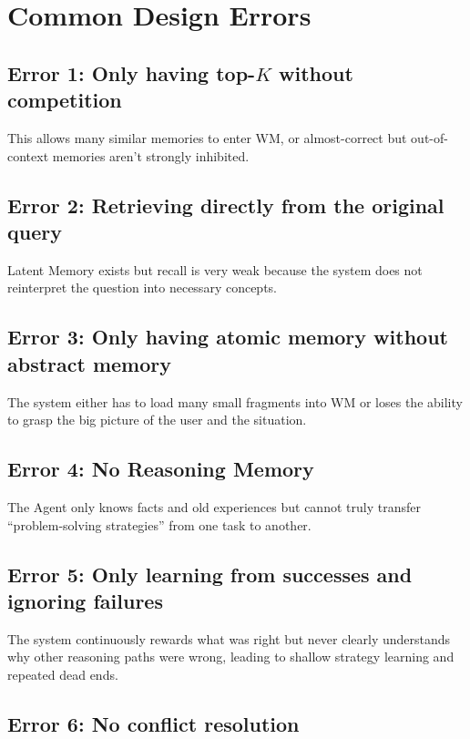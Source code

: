 \documentclass[a4paper,12pt]{article}
\begin{document}
\section{Common Design Errors}

\subsection*{Error 1: Only having top-$K$ without competition}

This allows many similar memories to enter WM, or almost-correct but out-of-context memories aren't strongly inhibited.

\subsection*{Error 2: Retrieving directly from the original query}

Latent Memory exists but recall is very weak because the system does not reinterpret the question into necessary concepts.

\subsection*{Error 3: Only having atomic memory without abstract memory}

The system either has to load many small fragments into WM or loses the ability to grasp the big picture of the user and the situation.

\subsection*{Error 4: No Reasoning Memory}

The Agent only knows facts and old experiences but cannot truly transfer ``problem-solving strategies'' from one task to another.

\subsection*{Error 5: Only learning from successes and ignoring failures}

The system continuously rewards what was right but never clearly understands why other reasoning paths were wrong, leading to shallow strategy learning and repeated dead ends.

\subsection*{Error 6: No conflict resolution}
\end{document}
